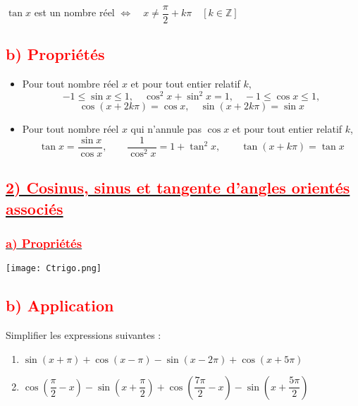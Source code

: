 \documentclass[a4paper,12pt]{article}
\begin{document}
$\tan x$ est un nombre réel \quad $\Longleftrightarrow \quad x \neq \dfrac{\pi}{2} + k\pi \quad \left[ k \in \mathbb{Z} \right]$

\subsection*{\textcolor{red}{b) Propriétés}}

\begin{itemize}
    \item Pour tout nombre réel \( x \) et pour tout entier relatif \( k \),
    \[
    -1 \leq \sin x \leq 1, \quad \cos^2 x + \sin^2 x = 1, \quad -1 \leq \cos x \leq 1,
    \]
    \[
    \cos(x + 2k\pi) = \cos x, \quad \sin(x + 2k\pi) = \sin x
    \]

    \item Pour tout nombre réel \( x \) qui n’annule pas \( \cos x \) et pour tout entier relatif \( k \),
    \[
    \tan x = \dfrac{\sin x}{\cos x}, \qquad \dfrac{1}{\cos^2 x} = 1 + \tan^2 x, \qquad \tan(x + k\pi) = \tan x
    \]
\end{itemize}

\subsection*{\underline{\textcolor{red}{2) Cosinus, sinus et tangente d’angles orientés associés}}}

\subsubsection*{\underline{\textcolor{red}{a) Propriétés}}}

\begin{center}
    \texttt{[image: Ctrigo.png]} %
\end{center}

\subsection*{\textcolor{red}{b) Application}}

Simplifier les expressions suivantes :

\begin{enumerate}
    \item 
    \(
    \sin(x + \pi) + \cos(x - \pi) - \sin(x - 2\pi) + \cos(x + 5\pi)
    \)
    
    \item 
    \(
    \cos\left( \dfrac{\pi}{2} - x \right) - \sin\left( x + \dfrac{\pi}{2} \right) + \cos\left( \dfrac{7\pi}{2} - x \right) - \sin\left( x + \dfrac{5\pi}{2} \right)
    \)
\end{enumerate}
\end{document}
